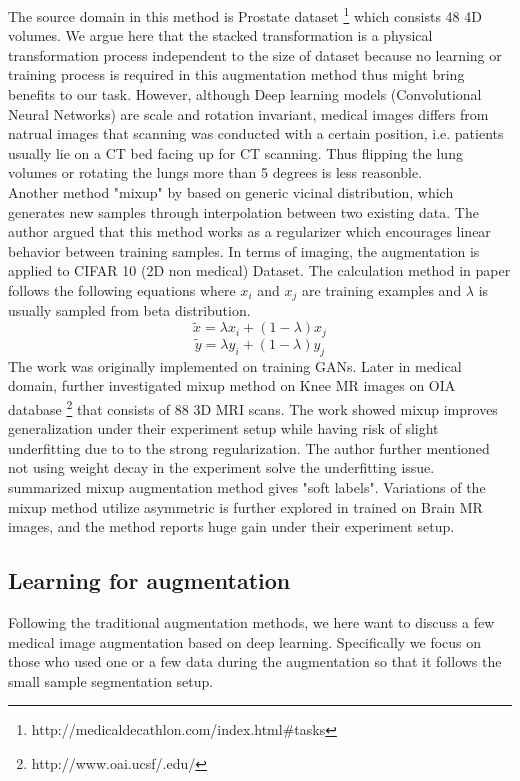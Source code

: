 The source domain in this method is Prostate dataset \footnote{http://medicaldecathlon.com/index.html\#tasks} which consists 48 4D volumes.
We argue here that the stacked transformation is a physical transformation process independent to the size of dataset because no learning or training process is required in this augmentation method thus might bring benefits to our task. However, although Deep learning models (Convolutional Neural Networks) are scale and rotation invariant, medical images differs from natrual images that scanning was conducted with a certain position, i.e. patients usually lie on a CT bed facing up for CT scanning. Thus flipping the lung volumes or rotating the lungs more than 5 degrees is less reasonble.\\


Another method "mixup" by \cite{zhang_mixup_2018} based on generic vicinal distribution, which generates new samples through interpolation between two existing data. The author argued that this method works as a regularizer which encourages linear behavior between training samples. In terms of imaging, the augmentation is applied to CIFAR 10 (2D non medical) Dataset. The calculation method in paper follows the following equations where $x_{i}$ and $x_{j}$ are training examples and $\lambda$ is usually sampled from beta distribution.
$$\tilde{x}=\lambda x_{i}+(1-\lambda) x_{j}$$
$$\tilde{y}=\lambda y_{i}+(1-\lambda) y_{j}$$
The work was originally implemented on training GANs. Later in medical domain, \cite{panfilov_improving_2019} further investigated mixup method on Knee MR images on OIA database \footnote{http://www.oai.ucsf/.edu/} that consists of 88 3D MRI scans. The work showed mixup improves generalization under their experiment setup while having risk of slight underfitting due to to the strong regularization. The author further mentioned not using weight decay in the experiment solve the underfitting issue.
\cite{tajbakhsh_embracing_2020} summarized mixup augmentation method gives "soft labels". Variations of the mixup method utilize asymmetric is further explored in \cite{li_overfitting_2019} trained on Brain MR images, and the method reports huge gain under their experiment setup.

\subsection{Learning for augmentation}
Following the traditional augmentation methods, we here want to discuss a few medical image augmentation based on deep learning. Specifically we focus on those who used one or a few data during the augmentation so that it follows the small sample segmentation setup.\\

